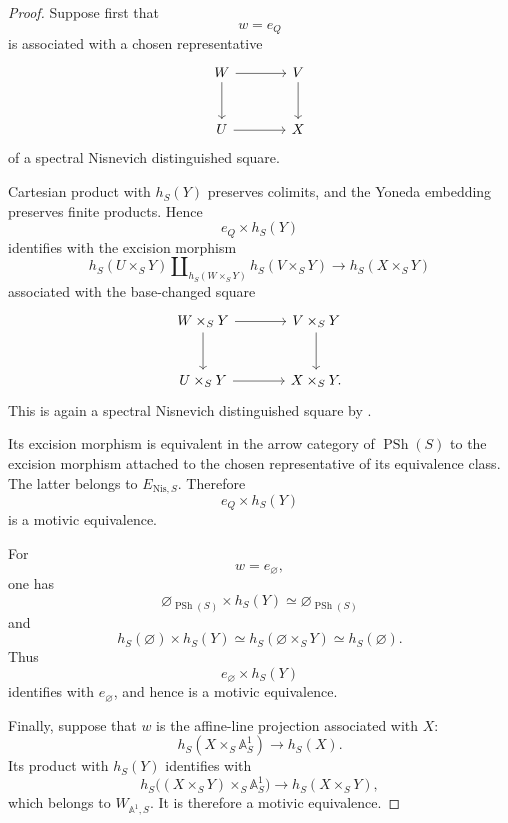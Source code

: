 \begin{proof}
Suppose first that
\[
    w
    =
    e_Q
\]
is associated with a chosen representative
\[
\begin{tikzcd}[column sep=large, row sep=large]
    W
        \arrow[r]
        \arrow[d]
    &
    V
        \arrow[d]
    \\
    U
        \arrow[r]
    &
    X
\end{tikzcd}
\]
of a spectral Nisnevich distinguished square.

Cartesian product with \(h_S(Y)\) preserves colimits, and the Yoneda
embedding preserves finite products. Hence
\[
    e_Q\times h_S(Y)
\]
identifies with the excision morphism
\[
    h_S(U\times_SY)
    \amalg_{h_S(W\times_SY)}
    h_S(V\times_SY)
    \longrightarrow
    h_S(X\times_SY)
\]
associated with the base-changed square
\[
\begin{tikzcd}[column sep=large, row sep=large]
    W\times_SY
        \arrow[r]
        \arrow[d]
    &
    V\times_SY
        \arrow[d]
    \\
    U\times_SY
        \arrow[r]
    &
    X\times_SY.
\end{tikzcd}
\]
This is again a spectral Nisnevich distinguished square by
.

Its excision morphism is equivalent in the arrow category of
\(\operatorname{PSh}(S)\) to the excision morphism attached to the
chosen representative of its equivalence class. The latter belongs to
\(E_{\mathrm{Nis},S}\). Therefore
\[
    e_Q\times h_S(Y)
\]
is a motivic equivalence.

For
\[
    w
    =
    e_{\varnothing},
\]
one has
\[
    \varnothing_{\operatorname{PSh}(S)}
    \times
    h_S(Y)
    \simeq
    \varnothing_{\operatorname{PSh}(S)}
\]
and
\[
    h_S(\varnothing)\times h_S(Y)
    \simeq
    h_S(\varnothing\times_SY)
    \simeq
    h_S(\varnothing).
\]
Thus
\[
    e_{\varnothing}\times h_S(Y)
\]
identifies with \(e_{\varnothing}\), and hence is a motivic
equivalence.

Finally, suppose that \(w\) is the affine-line projection associated
with \(X\):
\[
    h_S(X\times_S\mathbb A^1_S)
    \longrightarrow
    h_S(X).
\]
Its product with \(h_S(Y)\) identifies with
\[
    h_S
    \bigl(
        (X\times_SY)\times_S\mathbb A^1_S
    \bigr)
    \longrightarrow
    h_S(X\times_SY),
\]
which belongs to \(W_{\mathbb A^1,S}\). It is therefore a motivic
equivalence.
\end{proof}


